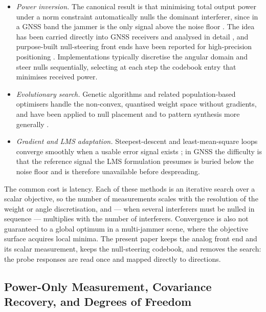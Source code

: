 \documentclass[journal]{IEEEtran}
\begin{document}
\begin{itemize}
\item \emph{Power inversion.} The canonical result is that minimising total
output power under a norm constraint automatically nulls the dominant
interferer, since in a GNSS band the jammer is the only signal above the noise
floor \cite{compton1979}. The idea has been carried directly into GNSS
receivers and analysed in detail \cite{Xu2010, Curran2015, Liu2019}, and
purpose-built null-steering front ends have been reported for
high-precision positioning \cite{9072446}. Implementations typically
discretise the angular domain and steer nulls sequentially, selecting at each
step the codebook entry that minimises received power.

\item \emph{Evolutionary search.} Genetic algorithms and related
population-based optimisers handle the non-convex, quantised weight space
without gradients, and have been applied to null placement and to pattern
synthesis more generally \cite{Lee2009, Kilic2018, Goudos2016}.

\item \emph{Gradient and LMS adaptation.} Steepest-descent and least-mean-square
loops converge smoothly when a usable error signal exists
\cite{Gecan1995, Johnson2005}; in GNSS the difficulty is that the reference
signal the LMS formulation presumes is buried below the noise floor and is
therefore unavailable before despreading.
\end{itemize}

The common cost is latency. Each of these methods is an iterative search over a
scalar objective, so the number of measurements scales with the resolution of
the weight or angle discretisation, and --- when several interferers must be
nulled in sequence --- multiplies with the number of interferers. Convergence
is also not guaranteed to a global optimum in a multi-jammer scene, where the
objective surface acquires local minima. The present paper keeps the analog
front end and its scalar measurement, keeps the null-steering codebook, and
removes the search: the probe responses are read once and mapped directly to
directions.

\subsection{Power-Only Measurement, Covariance Recovery, and Degrees of
Freedom}
\label{sec:lit:intensity}
\end{document}

